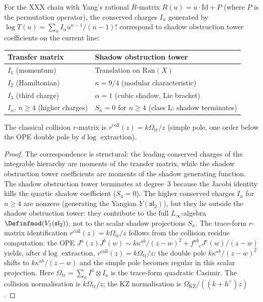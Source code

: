 \begin{proposition}%
\label{prop:transfer-matrix-shadow-dict}
For the XXX chain with Yang's rational $R$-matrix
$R(u) = u \cdot \mathrm{Id} + P$ \textup{(}where $P$ is the
permutation operator\textup{)}, the conserved charges $I_n$
generated by $\log T(u) = \sum_n I_n u^{n-1}/(n-1)!$ correspond to
shadow obstruction tower coefficients on the current line:
\begin{center}
\renewcommand{\arraystretch}{1.2}
\begin{tabular}{ll}
\toprule
Transfer matrix & Shadow obstruction tower \\
\midrule
$I_1$ \textup{(momentum)} & Translation on $\mathrm{Ran}(X)$ \\
$I_2$ \textup{(Hamiltonian)} & $\kappa = 9/4$ \textup{(modular characteristic)} \\
$I_3$ \textup{(third charge)} & $\alpha = 1$ \textup{(cubic shadow, Lie bracket)} \\
$I_n$, $n \ge 4$ \textup{(higher charges)} & $S_n = 0$ for $n \ge 4$ \textup{(class L: shadow terminates)} \\
\bottomrule
\end{tabular}
\end{center}
The classical collision $r$-matrix is
$r^{\mathrm{coll}}(z)=k\Omega_{\mathrm{tr}}/z$
\textup{(}simple pole, one order below the OPE double pole by
$d\log$ extraction\textup{)}.
\end{proposition}

\begin{proof}
The correspondence is structural: the leading conserved charges of the
integrable hierarchy are moments of the transfer matrix, while the
shadow obstruction tower coefficients are moments of the shadow generating function.
The shadow obstruction tower terminates at degree~$3$ because the Jacobi identity
kills the quartic shadow coefficient ($S_4 = 0$).
The higher conserved charges $I_n$ for $n \ge 4$ are nonzero
(generating the Yangian $Y(\mathfrak{sl}_2)$), but they lie
outside the shadow obstruction tower: they contribute to the full
$L_\infty$-algebra $\Definfmod(V_1(\mathfrak{sl}_2))$, not to
the scalar shadow projections $S_n$.
The trace-form $r$-matrix identification
$r^{\mathrm{coll}}(z)=k\Omega_{\mathrm{tr}}/z$ follows from the
collision residue computation: the OPE
$J^a(z)J^b(w) \sim k\kappa^{ab}/(z-w)^2 + f^{ab}{}_c J^c(w)/(z-w)$
yields, after $d\log$ extraction,
$r^{\mathrm{coll}}(z)=k\Omega_{\mathrm{tr}}/z$: the double pole
$k\kappa^{ab}/(z{-}w)^2$ shifts to
$k\kappa^{ab}/(z{-}w)$ and the simple pole becomes regular in this
scalar projection. Here
$\Omega_{\mathrm{tr}} = \sum_a I^a \otimes I_a$ is the trace-form
quadratic Casimir.  The collision normalisation is
$k\Omega_{\mathrm{tr}}/z$; the KZ normalisation is
\(\Omega_{\mathrm{KZ}}/((k+h^\vee)z)\).
\end{proof}

